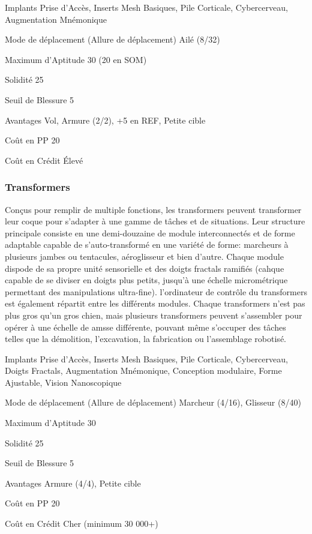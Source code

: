\begin{description*}
   \item[Implants] Prise d'Accès, Inserts Mesh Basiques, Pile Corticale, Cybercerveau, Augmentation Mnémonique
   \item[Mode de déplacement](Allure de déplacement) Ailé (8/32)
   \item[Maximum d'Aptitude] 30 (20 en SOM)
   \item[Solidité] 25
   \item[Seuil de Blessure] 5
   \item[Avantages] Vol, Armure (2/2), +5 en REF, Petite cible
   \item[Coût en PP] 20
   \item[Coût en Crédit] Élevé
\end{description*} 

\subsubsection{Transformers} \label{sec:starting-flexbots} 

Conçus pour remplir de multiple fonctions, les transformers peuvent transformer leur coque pour s'adapter à une gamme de tâches et de situations. Leur structure principale consiste en une demi-douzaine de module interconnectés et de forme adaptable capable de s'auto-transformé en une variété de forme: marcheurs à plusieurs jambes ou tentacules, aéroglisseur et bien d'autre. Chaque module dispode de sa propre unité sensorielle et des doigts fractals ramifiés (cahque capable de se diviser en doigts plus petits, jusqu'à une échelle micrométrique permettant des manipulations ultra-fine). l'ordinateur de contrôle du transformers est également répartit entre les différents modules. Chaque transformers n'est pas plus gros qu'un gros chien, mais plusieurs transformers peuvent s'assembler pour opérer à une échelle de amsse différente, pouvant même s'occuper des tâches telles que la démolition, l'excavation, la fabrication ou l'assemblage robotisé. 

\begin{description*} 
   \item[Implants] Prise d'Accès, Inserts Mesh Basiques, Pile Corticale, Cybercerveau, Doigts Fractals, Augmentation Mnémonique, Conception modulaire, Forme Ajustable, Vision Nanoscopique
   \item[Mode de déplacement](Allure de déplacement) Marcheur (4/16), Glisseur (8/40)
   \item[Maximum d'Aptitude] 30
   \item[Solidité] 25 
   \item[Seuil de Blessure] 5
   \item[Avantages] Armure (4/4), Petite cible
   \item[Coût en PP] 20
   \item[Coût en Crédit] Cher (minimum 30 000+)
\end{description*} 

